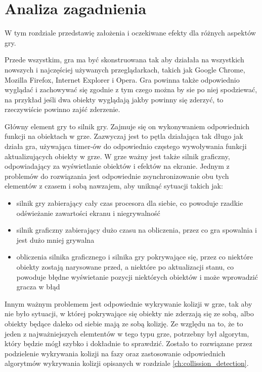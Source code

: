 \chapter{Analiza zagadnienia}
\label{ch:chapter_analysis}
\thispagestyle{chapterBeginStyle}

W tym rozdziale przedstawię założenia i oczekiwane efekty dla różnych aspektów gry.

Przede wszystkim, gra ma być skonstruowana tak aby działała na wszystkich nowszych i najczę\'sciej używanych przeglądarkach, takich jak Google Chrome, Mozilla Firefox, Internet Explorer i Opera.
Gra powinna także odpowiednio wyglądać i zachowywać się zgodnie z tym czego można by sie po niej spodziewać, na przykład je\'sli dwa obiekty wyglądają jakby powinny się zderzyć, to rzeczywi\'scie powinno zaj\'sć zderzenie.

Główny element gry to silnik gry. Zajmuje się on  wykonywaniem odpowiednich funkcji na obiektach w grze.
Zazwyczaj jest to pętla działająca tak długo jak działa gra, używająca timer-ów do odpowiednio częstego wywoływania funkcji aktualizujących obiekty w grze.
W grze ważny jest także silnik graficzny, odpowiadający za wy\'swietlanie obiektów i efektów na ekranie.
Jednym z problemów do rozwiązania jest odpowiednie zsynchronizowanie obu tych elementów z czasem i sobą nawzajem, aby uniknąć sytuacji takich jak:\begin{itemize}
	\item silnik gry zabierający cały czas procesora dla siebie, co powoduje rzadkie od\'swieżanie zawartości ekranu i niegrywalno\'sć
	\item silnik graficzny zabierający dużo czasu na obliczenia, przez co gra spowalnia i jest dużo mniej grywalna
	\item obliczenia silnika graficznego i silnika gry pokrywające się, przez co niektóre obiekty zostają narysowane przed, a niektóre po aktualizacji stanu, co powoduje błędne wy\'swietanie pozycji niektórych obiektów i może wprowadzić gracza w błąd
\end{itemize}

Innym ważnym problemem jest odpowiednie wykrywanie kolizji w grze, tak aby nie było sytuacji, w której pokrywające się obiekty nie zderzają się ze sobą, albo obiekty będące daleko od siebie mają ze sobą kolizję. Ze względu na to, że to jeden z najważniejszych elemtentów w tego typu grze, potrzebny był algorytm, który będzie mógł szybko i dokładnie to sprawdzić. Zostało to rozwiązane przez podzielenie wykrywania kolizji na fazy oraz zastosowanie odpowiednich algorytmów wykrywania kolizji opisanych w rozdziale \ref{ch:collission_detection}.

